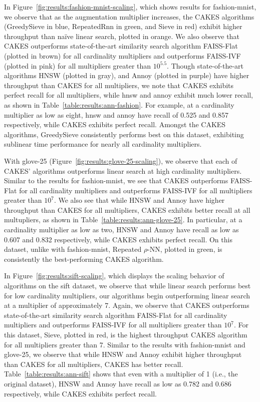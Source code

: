In Figure~\ref{fig:results:fashion-mnist-scaling}, which shows results for fashion-mnist, we observe that as the augmentation multiplier increases, the CAKES algorithms (GreedySieve in blue, RepeatedRnn in green, and Sieve in red) exhibit higher throughput than na\"{i}ve linear search, plotted in orange. 
We also observe that CAKES outperforms state-of-the-art similarity search algorithm FAISS-Flat (plotted in brown) for all cardinality multipliers and outperforms FAISS-IVF (plotted in pink) for all multipliers greater than $10^{5.5}$. 
Though state-of-the-art algorithms HNSW (plotted in gray), and Annoy (plotted in purple) have higher throughput than CAKES for all multipliers, we note that CAKES exhibits perfect recall for all multipliers, while hnsw and annoy exhibit much lower recall, as shown in Table~\ref{table:results:ann-fashion}. 
For example, at a cardinality multiplier as low as eight, hnsw and annoy have recall of 0.525 and 0.857 respectively, while CAKES exhibits perfect recall.
Amongst the CAKES algorithms, GreedySieve consistently performs best on this dataset, exhibiting sublinear time performance for nearly all cardinality multipliers. 


With glove-25 (Figure~\ref{fig:results:glove-25-scaling}), we observe that each of CAKES' algorithms outperforms linear search at high cardinality multipliers. 
Similar to the results for fashion-mnist, we see that CAKES outperforms FAISS-Flat for all cardinality multipliers and outperforms FAISS-IVF for all multipliers greater than $10^{7}$. 
We also see that while HNSW and Annoy have higher throughput than CAKES for all multipliers, CAKES exhibits better recall at all multupliers, as shown in Table~\ref{table:results:ann-glove-25}.
In particular, at a cardinality multiplier as low as two, HNSW and Annoy have recall as low as 0.607 and 0.832 respectively, while CAKES exhibits perfect recall.
On this dataset, unlike with fashion-mnist, Repeated $\rho$-NN, plotted in green, is consistently the best-performing CAKES algorithm. 


In Figure~\ref{fig:results:sift-scaling}, which displays the scaling behavior of algorithms on the sift dataset, we observe that while linear search performs best for low cardinality multipliers, our algorithms begin outperforming linear search at a multiplier of approximately 7. 
Again, we observe that CAKES outperforms state-of-the-art similarity search algorithm FAISS-Flat for all cardinality multipliers and outperforms FAISS-IVF for all multipliers greater than $10^{7}$. 
For this dataset, Sieve, plotted in red, is the highest throughput CAKES algorithm for all multipliers greater than 7. 
Similar to the results with fashion-mnist and glove-25, we observe that while HNSW and Annoy exhibit higher throughput than CAKES for all multipliers, CAKES has better recall. 
Table~\ref{table:results:ann-sift} shows that even with a multiplier of 1 (i.e., the original dataset), HNSW and Annoy have recall as low as 0.782 and 0.686 respectively, while CAKES exhibits perfect recall.



